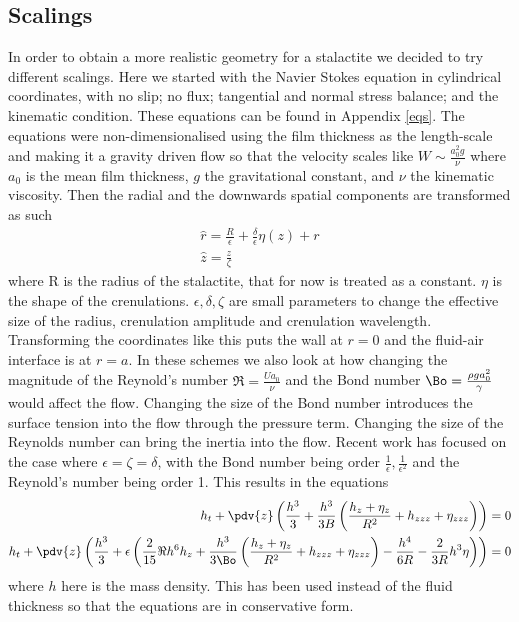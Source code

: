 \documentclass[12pt]{article}
\begin{document}
\subsection{Scalings}
In order to obtain a more realistic geometry for a stalactite we decided to try different scalings.
Here we started with the Navier Stokes equation in cylindrical coordinates, with no slip; no flux; tangential and normal stress balance; and the kinematic condition. These equations can be found in Appendix \ref{eqs}. The equations were non-dimensionalised using the film thickness as the length-scale and making it a gravity driven flow so that the velocity scales like $W\sim \frac{a_0^2 g}{\nu}$ where $a_0$ is the mean film thickness, $g$ the gravitational constant, and $\nu$ the kinematic viscosity. Then the radial and the downwards spatial components are transformed as such
\begin{align}
\hat{r} = \frac{R}{\epsilon} + \frac{\delta}{\epsilon}\eta(z) + r \\
\hat{z} = \frac{z}{\zeta}
\end{align}
where R is the radius of the stalactite, that for now is treated as a constant. $\eta$ is the shape of the crenulations. $\epsilon , \delta, \zeta$ are small parameters to change the effective size of the radius, crenulation amplitude and crenulation wavelength. Transforming the coordinates like this puts the wall at $r=0$ and the fluid-air interface is at $r = a$. In these schemes we also look at how changing the magnitude of the Reynold's number $\Re = \frac{Ua_0}{\nu}$  and the Bond number $\Bo =\frac{\rho g a_0^2}{\gamma}$ would affect the flow. Changing the size of the Bond number introduces the surface tension into the flow through the pressure term. Changing the size of the Reynolds number can bring the inertia into the flow.
Recent work has focused on the case where $\epsilon = \zeta = \delta$, with the Bond number being order $\frac{1}{\epsilon},\frac{1}{\epsilon^2}$ and the Reynold's number being order 1. This results in the equations
\begin{align}
	h_t + \pdv{z}\left(\frac{h^3}{3}  + \frac{h^3}{3B}\left(\frac{h_z+ \eta_z}{R^2} + h_{zzz}+ \eta_{zzz}\right)\right) = 0\\
	h_t + \pdv{z}\left(\frac{h^3}{3} +\epsilon\left(\frac{2}{15}\Re h^6 h_z + \frac{h^3}{3\Bo}\left(\frac{h_z+ \eta_z}{R^2} + h_{zzz}+ \eta_{zzz}\right)- \frac{h^4}{6R}- \frac{2}{3R}h^3\eta\right)\right)=0\label{maineq}
\end{align}
where $h$ here is the mass density. This has been used instead of the fluid thickness so that the equations are in conservative form. 
\end{document}
